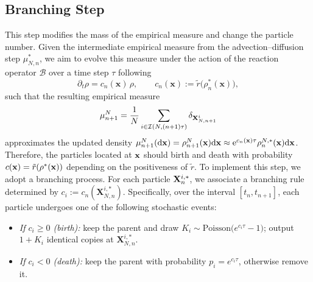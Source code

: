 \documentclass[preprint,12pt]{elsarticle}
\theoremstyle{definition}
\theoremstyle{remark}
\begin{document}
\subsection{Branching Step}
\label{sec:branching}
This step modifies the mass of the empirical measure and change the particle number. Given the intermediate empirical measure from the advection--diffusion step $\mu_{N,n}^*$, we aim to evolve this measure under the action of the reaction operator $\mathcal  B$ over a time step $\tau$ following
\[
\partial_t \rho = c_n(\mathbf{x})\,\rho,
\qquad c_n(\mathbf{x}) := \tilde r\!\big(\rho_n^\ast(\mathbf{x})\big),
\]
such that the resulting empirical measure
\begin{equation}
    \mu^N_{n+1} = \frac{1}{N} \sum_{i\in \mathcal I (N,(n+1)\tau)} \delta_{\mathbf{X}^i_{N,n+1}}
\end{equation}
approximates the updated density $\mu^N_{n+1}(\mathrm{d} \mathbf{x} ) = \rho^N_{n+1}(\mathbf{x}) \mathrm{d} \mathbf{x} \approx {\rm e}^{c_n(\mathbf{x}) \tau} \rho_{n}^{N,*}(\mathbf{x}) \mathrm{d} \mathbf{x}$. Therefore, the particles located at $\mathbf{x}$ should birth and death with probability $c(\mathbf{x})=\tilde r(\rho^*(\mathbf{x}))$ depending on the positiveness of $\tilde r$.
To implement this step, we adopt a branching process. For each particle $\mathbf{X}^{i,\ast}_{n}$, we associate a branching rule determined by $c_i:=c_n(\mathbf X^{i,\ast}_{N,n})$. Specifically, over the interval $[t_n,t_{n+1}]$, each particle undergoes one of the following stochastic events:
\begin{itemize}
  \item \emph{If \(c_i\ge 0\) (birth):} keep the parent and draw \(K_i\sim \mathrm{Poisson}\!\big(e^{c_i\tau}-1\big)\); output \(1+K_i\) identical copies at \(\mathbf X^{i,\ast}_{N,n}\).
  \item \emph{If \(c_i<0\) (death):} keep the parent with probability \(p_i=e^{c_i\tau}\), otherwise remove it.
\end{itemize}
\end{document}
